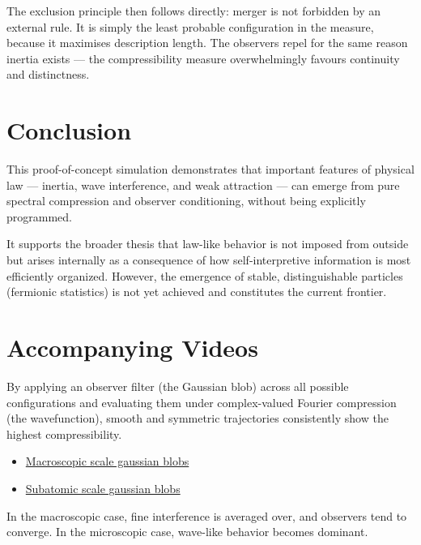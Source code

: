 The exclusion principle then follows directly: merger is not forbidden by an external rule.
It is simply the least probable configuration in the measure, because it maximises description length.
The observers repel for the same reason inertia exists — the compressibility measure overwhelmingly favours continuity and distinctness.


\section{Conclusion}

This proof-of-concept simulation demonstrates that important features of physical law — inertia, wave interference, and weak attraction — can emerge from pure spectral compression and observer conditioning, without being explicitly programmed.

It supports the broader thesis that law-like behavior is not imposed from outside but arises internally as a consequence of how self-interpretive information is most efficiently organized.
However, the emergence of stable, distinguishable particles (fermionic statistics) is not yet achieved and constitutes the current frontier.


\section{Accompanying Videos}

By applying an observer filter (the Gaussian blob) across all possible configurations and evaluating them under complex-valued Fourier compression (the wavefunction), smooth and symmetric trajectories consistently show the highest compressibility.

\begin{itemize}
    \item \href{https://youtu.be/G6p1Nrd1zBQ}{Macroscopic scale gaussian blobs}
    \item \href{https://youtu.be/Tx-LDoXpfWM}{Subatomic scale gaussian blobs}
\end{itemize}

In the macroscopic case, fine interference is averaged over, and observers tend to converge.
In the microscopic case, wave-like behavior becomes dominant.
